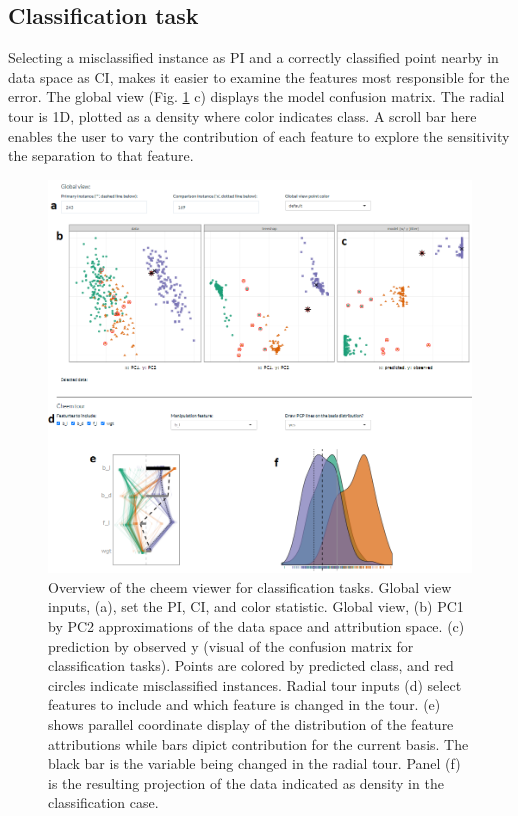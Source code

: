 \documentclass[
]{article}
\begin{document}
\hypertarget{classification-task}{%
\subsection{Classification task}\label{classification-task}}

Selecting a misclassified instance as PI and a correctly classified point nearby in data space as CI, makes it easier to examine the features most responsible for the error. The global view (Fig. \ref{fig:classificationcase} c) displays the model confusion matrix. The radial tour is 1D, plotted as a density where color indicates class. A scroll bar here enables the user to vary the contribution of each feature to explore the sensitivity the separation to that feature.

\begin{figure}

{\centering \includegraphics[width=1\linewidth]{./figures/app_classification} 

}

\caption{Overview of the cheem viewer for classification tasks. Global view inputs, (a), set the PI, CI, and color statistic. Global view, (b) PC1 by PC2 approximations of the data space and attribution space. (c) prediction by observed y (visual of the confusion matrix for classification tasks). Points are colored by predicted class, and red circles indicate misclassified instances. Radial tour inputs (d) select features to include and which feature is changed in the tour. (e) shows parallel coordinate display of the distribution of the feature attributions while bars dipict contribution for the current basis. The black bar is the variable being changed in the radial tour. Panel (f) is the resulting projection of the data indicated as density in the classification case.}\label{fig:classificationcase}
\end{figure}
\end{document}
